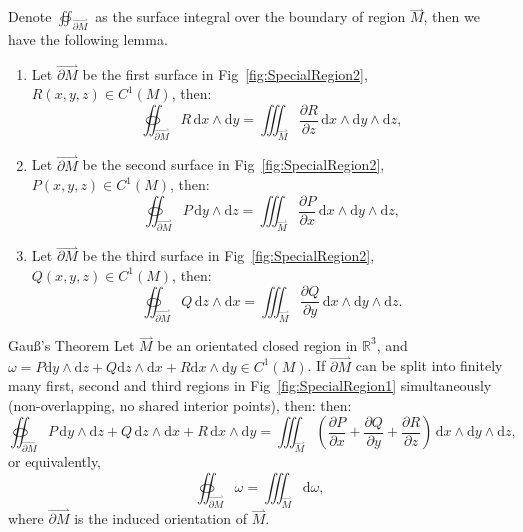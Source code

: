 \documentclass[11pt]{../../TexTemplate/elegantbook}
\begin{document}
Denote \(\oiint_{\overset{\rightharpoonup}{\partial M}}\) as the surface integral
over the boundary of region \(\overset{\rightharpoonup}{M}\), then we have the following lemma.
\begin{lemma}
    \begin{enumerate}
        \item Let \(\overset{\rightharpoonup}{\partial M}\) be the first surface in Fig~\ref{fig:SpecialRegion2},
            \(R(x, y, z) \in C^{1}(M)\), then:
            \[
            \oiint_{\overset{\rightharpoonup}{\partial M}} R \, \mathrm{d}x \wedge \mathrm{d}y = 
            \iiint_{\overset{\rightharpoonup}{M}} \frac{\partial R}{\partial z} \, \mathrm{d}x \wedge \mathrm{d}y \wedge \mathrm{d}z,
            \] 
        \item Let \(\overset{\rightharpoonup}{\partial M}\) be the second surface in Fig~\ref{fig:SpecialRegion2},
            \(P(x, y, z) \in C^{1}(M)\), then:
            \[
            \oiint_{\overset{\rightharpoonup}{\partial M}} P \, \mathrm{d}y \wedge \mathrm{d}z = 
            \iiint_{\overset{\rightharpoonup}{M}} \frac{\partial P}{\partial x} \, \mathrm{d}x \wedge \mathrm{d}y \wedge \mathrm{d}z,
            \]
        \item Let \(\overset{\rightharpoonup}{\partial M}\) be the third surface in Fig~\ref{fig:SpecialRegion2},
            \(Q(x, y, z) \in C^{1}(M)\), then:
            \[
            \oiint_{\overset{\rightharpoonup}{\partial M}} Q \, \mathrm{d}z \wedge \mathrm{d}x = 
            \iiint_{\overset{\rightharpoonup}{M}} \frac{\partial Q}{\partial y} \, \mathrm{d}x \wedge \mathrm{d}y \wedge \mathrm{d}z.
            \]
    \end{enumerate}
\end{lemma}

\begin{theorem}{Gauß's Theorem}
    Let \(\overset{\rightharpoonup}{M}\) be an orientated closed region in \(\mathbb{R}^{3}\),
    and \(\omega = P\mathrm{d}y \wedge \mathrm{d}z + Q \mathrm{d}z \wedge \mathrm{d}x 
    + R \mathrm{d}x \wedge \mathrm{d}y \in C^{1}(M)\).
    If \(\overset{\rightharpoonup}{\partial M}\) can be split into finitely many first, second and third regions
    in Fig~\ref{fig:SpecialRegion1} simultaneously (non-overlapping, no shared interior points),
    then:
    then:
    \[
    \oiint_{\overset{\rightharpoonup}{\partial M}} P \, \mathrm{d}y \wedge \mathrm{d}z + Q \, \mathrm{d}z \wedge \mathrm{d}x + R \, \mathrm{d}x \wedge \mathrm{d}y = 
    \iiint_{\overset{\rightharpoonup}{M}} \left( 
        \frac{\partial P}{\partial x} + 
        \frac{\partial Q}{\partial y} + 
        \frac{\partial R}{\partial z} 
    \right) \, \mathrm{d}x \wedge \mathrm{d}y \wedge \mathrm{d}z,
    \]
    or equivalently,
    \[
    \oiint_{\overset{\rightharpoonup}{\partial M}} \omega = 
    \iiint_{\overset{\rightharpoonup}{M}} \mathrm{d}\omega,
    \]
    where \(\overset{\rightharpoonup}{\partial M}\) is the induced orientation of \(\overset{\rightharpoonup}{M}\).
\end{theorem}
\end{document}
